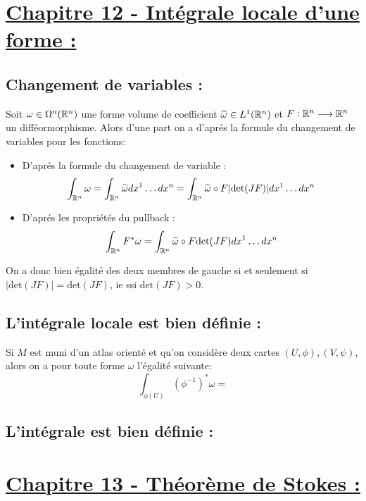 \section*{\uline{Chapitre 12 - Intégrale locale d'une forme {:}}}
   \subsection*{Changement de variables {:}}
   Soit \( \omega \in \Omega^n( \mathbb{R}^n) \) une forme volume de coefficient \( \widetilde{\omega} \in L^1(\mathbb{R}^n) \) et \( F : \mathbb{R}^n \longrightarrow \mathbb{R}^n \) un difféormorphisme. Alors d'une part on a d'aprés la formule du changement de variables pour les fonctions:
   \begin{itemize}
      \item D'aprés la formule du changement de variable :
      \[ 
         \int_{\mathbb{R}^n} \omega =  \int_{\mathbb{R}^n} \widetilde{\omega}dx^1 \ldots dx^n = \int_{\mathbb{R}^n} \widetilde{\omega} \circ F |\text{det}(JF)| dx^1 \ldots dx^n
      \]
      \item D'aprés les propriétés du pullback :
      \[ 
         \int_{\mathbb{R}^n} F^*\omega = \int_{\mathbb{R}^n} \widetilde{\omega} \circ F \text{det}(JF) dx^1 \ldots dx^n
      \]
   \end{itemize}
   On a donc bien égalité des deux membres de gauche si et seulement si \( |\text{det}(JF)| = \text{det}(JF) \), ie ssi \( \text{det}(JF) > 0 \).
   \subsection*{L'intégrale locale est bien définie {:}}
   Si \( M \) est muni d'un atlas orienté et qu'on considère deux cartes \( (U, \phi), (V, \psi) \), alors on a pour toute forme \( \omega \) l'égalité suivante:
   \[ 
      \int_{\phi(U)} (\phi^{-1})^* \omega = 
   \]
   \subsection*{L'intégrale est bien définie {:}}
\pagebreak

\section*{\uline{Chapitre 13 - Théorème de Stokes {:}}}

